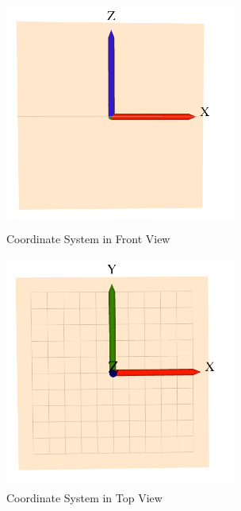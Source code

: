 \documentclass [11pt]{book}
\begin{document}
\begin{figure}
\begin{center}
\includegraphics[width=3in,height=3in]{../images/coord-sys-front.png}
\end{center}

\caption{Coordinate System in Front View}

\label{fig:coord-sys-front}

\end{figure}

\begin{figure}
\begin{center}
\includegraphics[width=3in,height=3in]{../images/coord-sys-top.png}
\end{center}

\caption{Coordinate System in Top View}

\label{fig:coord-sys-top}

\end{figure}
\end{document}
